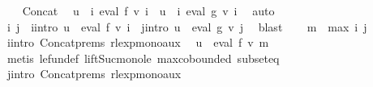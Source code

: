 \begin{isabellebody}
\ \ \isamarkupfalse%
\ Concat\ \isamarkupfalse%
\ {\isachardoublequoteopen}u\ {\isasymin}\ {\isacharparenleft}{\kern0pt}{\isasymUnion}i{\isachardot}{\kern0pt}\ eval\ f\ {\isacharparenleft}{\kern0pt}v\ i{\isacharparenright}{\kern0pt}{\isacharparenright}{\kern0pt}\ {\isasymand}\ u{\isacharprime}{\kern0pt}\ {\isasymin}\ {\isacharparenleft}{\kern0pt}{\isasymUnion}i{\isachardot}{\kern0pt}\ eval\ g\ {\isacharparenleft}{\kern0pt}v\ i{\isacharparenright}{\kern0pt}{\isacharparenright}{\kern0pt}{\isachardoublequoteclose}\ \isamarkupfalse%
\ auto\isanewline
\ \ \isamarkupfalse%
\ \isamarkupfalse%
\ i\ j\ \ i{\isacharunderscore}{\kern0pt}intro{\isacharcolon}{\kern0pt}\ {\isachardoublequoteopen}u\ {\isasymin}\ eval\ f\ {\isacharparenleft}{\kern0pt}v\ i{\isacharparenright}{\kern0pt}{\isachardoublequoteclose}\ \ j{\isacharunderscore}{\kern0pt}intro{\isacharcolon}{\kern0pt}\ {\isachardoublequoteopen}u{\isacharprime}{\kern0pt}\ {\isasymin}\ eval\ g\ {\isacharparenleft}{\kern0pt}v\ j{\isacharparenright}{\kern0pt}{\isachardoublequoteclose}\ \isamarkupfalse%
\ blast\isanewline
\ \ \isamarkupfalse%
\ {\isacharquery}{\kern0pt}m\ {\isacharequal}{\kern0pt}\ {\isachardoublequoteopen}max\ i\ j{\isachardoublequoteclose}\isanewline
\ \ \isamarkupfalse%
\ i{\isacharunderscore}{\kern0pt}intro\ Concat{\isachardot}{\kern0pt}prems{\isacharparenleft}{\kern0pt}{}{\isacharparenright}{\kern0pt}\ rlexp{\isacharunderscore}{\kern0pt}mono{\isacharunderscore}{\kern0pt}aux\ \isamarkupfalse%
\ {\isachardoublequoteopen}u\ {\isasymin}\ eval\ f\ {\isacharparenleft}{\kern0pt}v\ {\isacharquery}{\kern0pt}m{\isacharparenright}{\kern0pt}{\isachardoublequoteclose}\isanewline
\ \ \ \ \isamarkupfalse%
\ {\isacharparenleft}{\kern0pt}metis\ le{\isacharunderscore}{\kern0pt}fun{\isacharunderscore}{\kern0pt}def\ lift{\isacharunderscore}{\kern0pt}Suc{\isacharunderscore}{\kern0pt}mono{\isacharunderscore}{\kern0pt}le\ max{\isachardot}{\kern0pt}cobounded{}\ subset{\isacharunderscore}{\kern0pt}eq{\isacharparenright}{\kern0pt}\isanewline
\ \ \isamarkupfalse%
\ \isamarkupfalse%
\ j{\isacharunderscore}{\kern0pt}intro\ Concat{\isachardot}{\kern0pt}prems{\isacharparenleft}{\kern0pt}{}{\isacharparenright}{\kern0pt}\ rlexp{\isacharunderscore}{\kern0pt}mono{\isacharunderscore}{\kern0pt}aux\ \isamarkupfalse%

\end{isabellebody}
